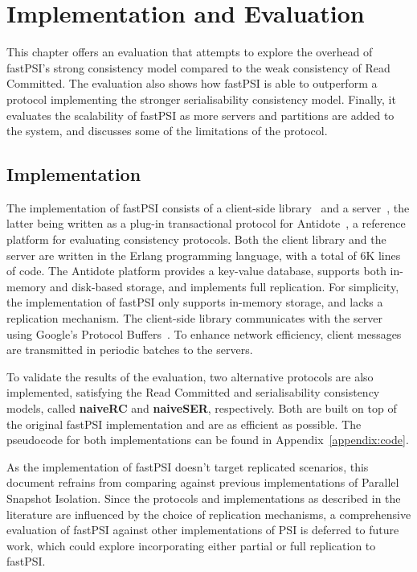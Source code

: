 \cleardoublepage
\chapter{Implementation and Evaluation}
\label{chapter:evaluation}

This chapter offers an evaluation that attempts to explore the overhead of fastPSI's strong consistency model compared to the weak consistency of Read Committed. The evaluation also shows how fastPSI is able to outperform a protocol implementing the stronger serialisability consistency model. Finally, it evaluates the scalability of fastPSI as more servers and partitions are added to the system, and discusses some of the limitations of the protocol.

\section{Implementation}

The implementation of fastPSI consists of a client-side library~\citep{fastPSIclient} and a server~\citep{pvc-server}, the latter being written as a plug-in transactional protocol for Antidote~\citep{antidote-db}, a reference platform for evaluating consistency protocols. Both the client library and the server are written in the Erlang programming language, with a total of 6K lines of code. The Antidote platform provides a key-value database, supports both in-memory and disk-based storage, and implements full replication. For simplicity, the implementation of fastPSI only supports in-memory storage, and lacks a replication mechanism. The client-side library communicates with the server using Google's Protocol Buffers~\citep{protobuf}. To enhance network efficiency, client messages are transmitted in periodic batches to the servers.

To validate the results of the evaluation, two alternative protocols are also implemented, satisfying the Read Committed and serialisability consistency models, called \textbf{naiveRC} and \textbf{naiveSER}, respectively. Both are built on top of the original fastPSI implementation and are as efficient as possible. The pseudocode for both implementations can be found in Appendix~\ref{appendix:code}.

As the implementation of fastPSI doesn't target replicated scenarios, this document refrains from comparing against previous implementations of Parallel Snapshot Isolation. Since the protocols and implementations as described in the literature are influenced by the choice of replication mechanisms, a comprehensive evaluation of fastPSI against other implementations of PSI is deferred to future work, which could explore incorporating either partial or full replication to fastPSI.

